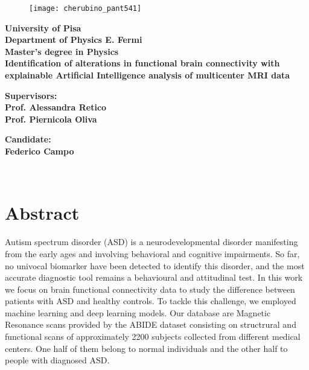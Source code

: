 \documentclass[11pt]{report}
\author{Federico}
\begin{document}
\begin{titlepage}
\begin{figure}[t]
\centering
\texttt{[image: cherubino\_pant541]}
\end{figure}

\begin{center}
	\textbf{University of Pisa \\ Department of Physics E. Fermi\\ Master's degree in Physics\\}
	\vspace{20mm}
    {\LARGE{\bf Identification of alterations in functional brain connectivity with explainable Artificial Intelligence analysis of multicenter MRI data}}
\end{center}

\vspace{36mm}
\begin{minipage}[t]{0.47\textwidth}
	{\large{\bf Supervisors:\\ Prof. Alessandra Retico\\ Prof. Piernicola Oliva}}
\end{minipage}\hfill\begin{minipage}[t]{0.47\textwidth}\raggedleft
	{\large{\bf Candidate: \\ Federico Campo}}
\end{minipage}

\vspace{50mm}
\hrulefill
\\

\end{titlepage}


\tableofcontents

\chapter*{Abstract}

Autism spectrum disorder (ASD) is a neurodevelopmental disorder manifesting from the early ages and involving behavioral and cognitive impairments. So far, no univocal biomarker have been detected to identify this disorder, and the most accurate diagnostic tool remains a behavioural and attitudinal test.
In this work we focus on brain functional connectivity data to study the difference between patients with ASD and healthy controls. To tackle this challenge, we  employed machine learning and deep learning models.
Our database are Magnetic Resonance scans provided by the ABIDE dataset consisting on structrural and functional scans of approximately 2200 subjects collected from different medical centers.
One half of them belong to normal individuals and the other half to people with diagnosed ASD.
\end{document}
